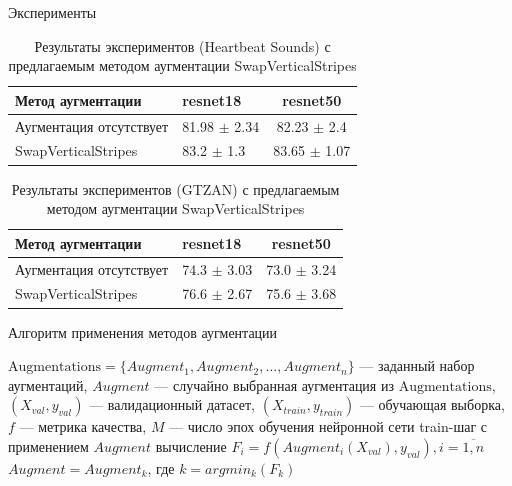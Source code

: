 \documentclass[12pt, fleqn]{beamer}
\begin{document}
\begin{frame}{Эксперименты}
	\begin{table}[ht!]
    \centering
	\begin{tabular}{| l | l | c |}
    	\hline
	    Метод аугментации & resnet18 & resnet50 \\ \hline
	    Аугментация отсутствует  & 81.98 $\pm$ 2.34 & 82.23 $\pm$ 2.4 \\ \hline
	    SwapVerticalStripes & 83.2 $\pm$ 1.3 & 83.65 $\pm$ 1.07 \\ \hline
	\end{tabular}
	\caption{Результаты экспериментов (Heartbeat Sounds) с предлагаемым методом аугментации SwapVerticalStripes}
	\label{table:lukianov_pavel_t1}
\end{table}

\begin{table}[ht!]
    \centering
	\begin{tabular}{| l | l | c |}
    	\hline
	    Метод аугментации & resnet18 & resnet50 \\ \hline
	    Аугментация отсутствует  & 74.3 $\pm$ 3.03 & 73.0 $\pm$ 3.24 \\ \hline
	    SwapVerticalStripes & 76.6 $\pm$ 2.67 & 75.6 $\pm$ 3.68 \\ \hline
	\end{tabular}
	\caption{Результаты экспериментов (GTZAN) с предлагаемым методом аугментации SwapVerticalStripes}
	\label{table:lukianov_pavel_t2}
\end{table}
\end{frame}

\begin{frame}{Алгоритм применения методов аугментации}

\algrenewcommand{}
\algrenewcommand{}

\begin{algorithm}[H]
    \caption{Предлагаемый алгоритм}\label{alg:Alg1}
    \begin{algorithmic}
    \State $\text{Augmentations} = \{Augment_1, Augment_2, ..., Augment_n\}$ --- заданный набор аугментаций,
    \State $Augment$ --- случайно выбранная аугментация  из $\text{Augmentations}$,
    \State $(X_{val}, y_{val})$ --- валидационный датасет, 
    \State $(X_{train}, y_{train})$ --- обучающая выборка,
    \State $f$ --- метрика качества,
    \State $M$ --- число эпох обучения нейронной сети
    \State train-шаг с применением $Augment$
    \State вычисление $F_i = f(Augment_i(X_{val}), y_{val}), i = \overline{1,n}$
    \State $Augment = Augment_k$, где $k = argmin_k(F_k)$
    \EndFor
    \end{algorithmic}
\end{algorithm}
\end{frame}
\end{document}
